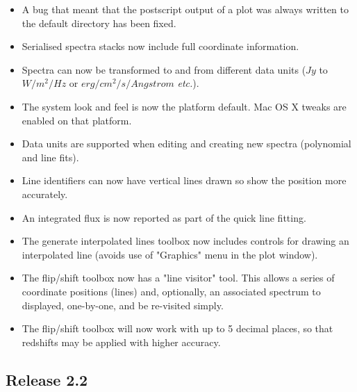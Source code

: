 \documentclass[twoside,11pt]{article}
\renewcommand{\_}{\texttt{\symbol{95}}}
\newcommand{\etc}{\textit{etc.}}
\begin{document}
\begin{itemize}
\item A bug that meant that the postscript output of a plot was always
      written to the default directory has been fixed.

\item Serialised spectra stacks now include full coordinate information.

\item Spectra can now be transformed to and from different data units
      ($Jy$ to $W/m^{2}/Hz$ or $erg/cm^{2}/s/Angstrom$ \etc).

\item The system look and feel is now the platform default. Mac OS X tweaks
      are enabled on that platform.

\item Data units are supported when editing and creating new spectra
     (polynomial and line fits).

\item Line identifiers can now have vertical lines drawn so show the 
      position more accurately. 

\item An integrated flux is now reported as part of the quick line fitting.

\item The generate interpolated lines toolbox now includes controls for
      drawing an interpolated line (avoids use of "Graphics" menu in 
      the plot window).

\item The flip/shift toolbox now has a "line visitor" tool. This allows a
      series of coordinate positions (lines) and, optionally, an associated
      spectrum to displayed, one-by-one, and be re-visited simply.

\item The flip/shift toolbox will now work with up to 5 decimal places, so 
      that redshifts may be applied with higher accuracy.

\end{itemize}


\subsection{Release 2.2}
\end{document}
